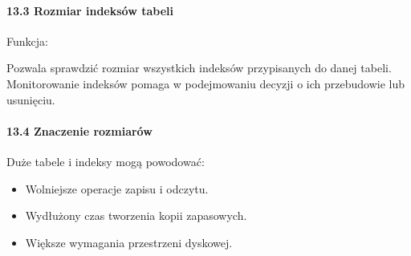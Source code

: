 \documentclass[letterpaper,10pt,polish]{sphinxmanual}
\begin{document}
\begin{sphinxVerbatim}[commandchars=\\\{\}]
    
    
 
   
\end{sphinxVerbatim}


\paragraph{13.3 Rozmiar indeksów tabeli}
\label{\detokenize{rozdzial2/Konfiguracja_baz_danych/Konfiguracja_baz_danych:rozmiar-indeksow-tabeli}}
\sphinxAtStartPar
Funkcja:

\begin{sphinxVerbatim}[commandchars=\\\{\}]
\end{sphinxVerbatim}

\sphinxAtStartPar
Pozwala sprawdzić rozmiar wszystkich indeksów przypisanych do danej tabeli. Monitorowanie indeksów pomaga w podejmowaniu decyzji o ich przebudowie lub usunięciu.


\paragraph{13.4 Znaczenie rozmiarów}
\label{\detokenize{rozdzial2/Konfiguracja_baz_danych/Konfiguracja_baz_danych:znaczenie-rozmiarow}}
\sphinxAtStartPar
Duże tabele i indeksy mogą powodować:
\begin{itemize}
\item {} 
\sphinxAtStartPar
Wolniejsze operacje zapisu i odczytu.

\item {} 
\sphinxAtStartPar
Wydłużony czas tworzenia kopii zapasowych.

\item {} 
\sphinxAtStartPar
Większe wymagania przestrzeni dyskowej.

\end{itemize}
\end{document}
